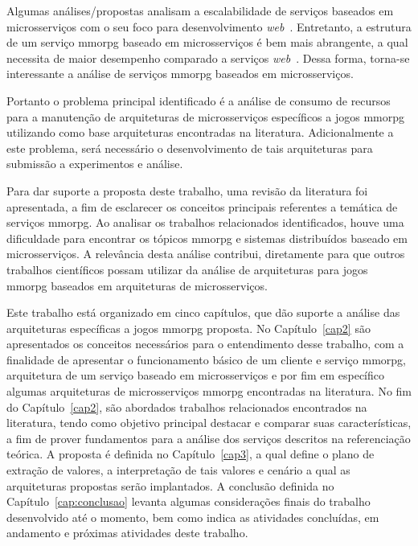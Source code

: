 Algumas análises/propostas analisam a escalabilidade de serviços baseados em microsserviços com o seu foco para desenvolvimento \textit{web}~\cite{photon_engine, mmorpg_culture}.
%
Entretanto, a estrutura de um serviço \ac{mmorpg} baseado em microsserviços é bem mais abrangente, a qual necessita de maior desempenho comparado a serviços \textit{web}~\cite{photon_engine, mmorpg_culture}.
%
Dessa forma, torna-se interessante a análise de serviços \ac{mmorpg} baseados em microsserviços.



Portanto o problema principal identificado é a análise de consumo de recursos para a manutenção de arquiteturas de microsserviços específicos a jogos \ac{mmorpg} utilizando como base arquiteturas encontradas na literatura.
%
Adicionalmente a este problema, será necessário o desenvolvimento de tais arquiteturas para submissão a experimentos e análise.



Para dar suporte a proposta deste trabalho, uma revisão da literatura foi apresentada, a fim de esclarecer os conceitos principais referentes a temática de serviços \ac{mmorpg}.
%
Ao analisar os trabalhos relacionados identificados, houve uma dificuldade para encontrar os tópicos \ac{mmorpg} e sistemas distribuídos baseado em microsserviços.
%
A relevância desta análise contribui, diretamente para que outros trabalhos científicos possam utilizar da análise de arquiteturas para jogos \ac{mmorpg} baseados em arquiteturas de microsserviços.



Este trabalho está organizado em cinco capítulos, que dão suporte a análise das arquiteturas específicas a jogos \ac{mmorpg} proposta.
%
No Capítulo~\ref{cap2} são apresentados os conceitos necessários para o entendimento desse trabalho, com a finalidade de apresentar o funcionamento básico de um cliente e serviço \ac{mmorpg}, arquitetura de um serviço baseado em microsserviços e por fim em específico algumas arquiteturas de microsserviços \ac{mmorpg} encontradas na literatura.
%
No fim do Capítulo~\ref{cap2}, são abordados trabalhos relacionados encontrados na literatura, tendo como objetivo principal destacar e comparar suas características, a fim de prover fundamentos para a análise dos serviços descritos na referenciação teórica.
%
A proposta é definida no Capítulo~\ref{cap3}, a qual define o plano de extração de valores, a interpretação de tais valores e cenário a qual as arquiteturas propostas serão implantados.
%
A conclusão definida no Capítulo~\ref{cap:conclusao} levanta algumas considerações finais do trabalho desenvolvido até o momento, bem como indica as atividades concluídas, em andamento e próximas atividades deste trabalho.




